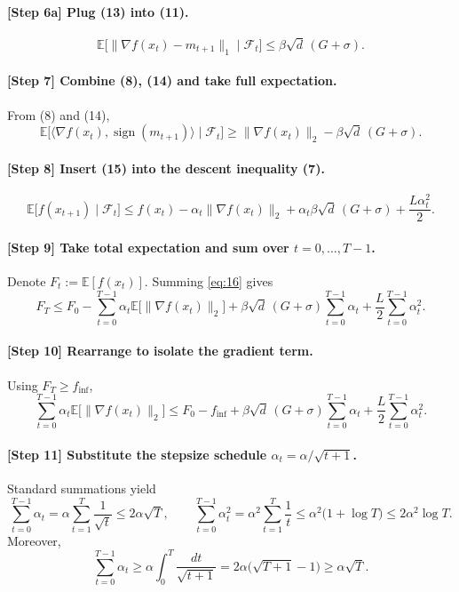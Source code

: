 \documentclass{article}
\newcommand{\E}{\mathbb{E}}
\begin{document}
\paragraph{[Step 6a] Plug (13) into (11).}
\[
\E\!\big[\|\nabla f(x_t)-m_{t+1}\|_{1}\mid\mathcal{F}_t\big]
\le \beta\sqrt{d}\,(G+\sigma).
\tag{14}
\]

\paragraph{[Step 7] Combine (8), (14) and take full expectation.}
From (8) and (14),
\[
\E\!\big[\langle\nabla f(x_t),\operatorname{sign}(m_{t+1})\rangle\mid\mathcal{F}_t\big]
\ge \|\nabla f(x_t)\|_{2}
-\beta\sqrt{d}\,(G+\sigma).
\tag{15}
\]

\paragraph{[Step 8] Insert (15) into the descent inequality (7).}
\[
\E\!\big[f(x_{t+1})\mid\mathcal{F}_t\big]
\le f(x_t)-\alpha_t\|\nabla f(x_t)\|_{2}
+\alpha_t\beta\sqrt{d}\,(G+\sigma)
+\frac{L\alpha_t^{2}}{2}.
\tag{16}
\]

\paragraph{[Step 9] Take total expectation and sum over $t=0,\dots,T-1$.}
Denote $F_t:=\E[f(x_t)]$. Summing \eqref{eq:16} gives
\[
F_T \le F_0
-\sum_{t=0}^{T-1}\alpha_t \E\!\big[\|\nabla f(x_t)\|_{2}\big]
+ \beta\sqrt{d}\,(G+\sigma)\sum_{t=0}^{T-1}\alpha_t
+\frac{L}{2}\sum_{t=0}^{T-1}\alpha_t^{2}.
\tag{17}
\]

\paragraph{[Step 10] Rearrange to isolate the gradient term.}
Using $F_T\ge f_{\inf}$,
\[
\sum_{t=0}^{T-1}\alpha_t \E\!\big[\|\nabla f(x_t)\|_{2}\big]
\le F_0-f_{\inf}
+ \beta\sqrt{d}\,(G+\sigma)\sum_{t=0}^{T-1}\alpha_t
+\frac{L}{2}\sum_{t=0}^{T-1}\alpha_t^{2}.
\tag{18}
\]

\paragraph{[Step 11] Substitute the stepsize schedule $\alpha_t=\alpha/\sqrt{t+1}$.}
Standard summations yield
\[
\sum_{t=0}^{T-1}\alpha_t
= \alpha\sum_{t=1}^{T}\frac{1}{\sqrt{t}}
\le 2\alpha\sqrt{T},
\qquad
\sum_{t=0}^{T-1}\alpha_t^{2}
= \alpha^{2}\sum_{t=1}^{T}\frac{1}{t}
\le \alpha^{2}\big(1+\log T\big)
\le 2\alpha^{2}\log T .
\tag{19}
\]
Moreover,
\[
\sum_{t=0}^{T-1}\alpha_t
\ge \alpha\int_{0}^{T}\frac{dt}{\sqrt{t+1}}
=2\alpha\big(\sqrt{T+1}-1\big)\ge \alpha\sqrt{T}.
\tag{20}
\]
\end{document}
